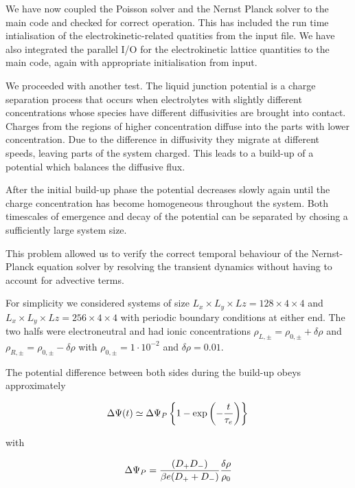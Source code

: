 \documentclass[aps,pre,preprint,groupedaddress]{revtex4-1}
\newcommand{\e}[1]{\cdot10^{#1}}
\begin{document}
We have now coupled the Poisson solver and the Nernst Planck solver
to the main code and checked for correct operation. This has included
the run time intialisation of the electrokinetic-related quatities
from the input file. We have also integrated the parallel I/O for
the electrokinetic lattice quantities to the main code, again with
appropriate initialisation from input.

We proceeded with another test. The liquid junction potential 
is a charge separation process that 
occurs when electrolytes with slightly different concentrations
whose species have different diffusivities are brought into contact.
Charges from the regions of higher concentration diffuse   
into the parts with lower concentration. Due to the difference 
in diffusivity they migrate at different speeds, leaving parts of
the system charged. This leads to a build-up of a potential
which balances the diffusive flux.

After the initial build-up phase the potential decreases slowly 
again until the charge concentration has become homogeneous throughout 
the system. Both timescales of emergence and decay of the potential
can be separated by chosing a sufficiently large system size.

This problem allowed us to verify the correct temporal 
behaviour of the Nernst-Planck equation solver by resolving the transient 
dynamics without having to account for advective terms.

For simplicity we considered systems of size 
$L_x\times L_y\times Lz=128\times4\times4$ and 
$L_x\times L_y\times Lz=256\times4\times4$ with
periodic boundary conditions at either end.
The two halfs were electroneutral and had ionic concentrations 
$\rho_{L,\pm}=\rho_{0,\pm} + \delta\rho$ and 
$\rho_{R,\pm}=\rho_{0,\pm} - \delta\rho$ 
with $\rho_{0,\pm}=1\e{-2}$ and $\delta\rho = 0.01$.

The potential difference between both sides during the build-up 
obeys approximately

\begin{equation}
\Delta\Psi(t)\simeq\Delta\Psi_P \left\{1-\exp\left(-\frac{t}{\tau_e}\right)\right\}\\
\end{equation}

with 

\begin{equation}
\Delta\Psi_P=\frac{(D_+ D_-)}{\beta e (D_+ + D_-)} \frac{\delta\rho}{\rho_0}\\ 
\end{equation}
\end{document}
